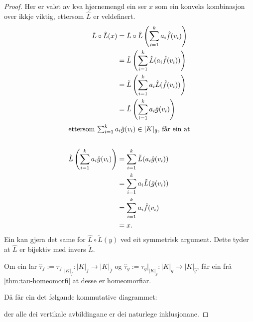 \documentclass[a4paper, 12pt, norsk]{article}
\theoremstyle{plain}
\theoremstyle{definition}
\newcommand{\Rb}{\mathbb{R}}
\newcommand{\gr}[1]{ \lvert #1 \rvert } %
\begin{document}
\begin{proof}
	Her er valet av kva hjørnemengd ein ser \( x \) som ein konveks kombinasjon over ikkje viktig, ettersom $\hat{L}$ er veldefinert.
	\begin{align*}
		\tilde{L}\circ \hat{L}(x) &= \tilde{L}\circ \hat{L}\left(\sum_{i=1}^ka_i\hat{f}(v_i)\right) \\
		&= \tilde{L}\left(\sum_{i=1}^k\hat{L}(a_i\hat{f}(v_i))\right) \\
		&= \tilde{L}\left(\sum_{i=1}^ka_i\hat{L}(\hat{f}(v_i))\right) \\
		&= \tilde{L}\left(\sum_{i=1}^ka_i\hat{g}(v_i)\right) \\
		\intertext{ettersom $\sum_{i=1}^ka_i\hat{g}(v_i)\in\gr{K}_{\hat{g}}$, får ein at} \\
		\tilde{L}\left(\sum_{i=1}^ka_i\hat{g}(v_i)\right) &= \sum_{i=1}^k\tilde{L}(a_i\hat{g}(v_i)) \\
		&= \sum_{i=1}^ka_i\tilde{L}(\hat{g}(v_i)) \\
		&= \sum_{i=1}^ka_i\hat{f}(v_i) \\
		&= x.
	\end{align*}
	Ein kan gjera det same for $\hat{L}\circ\tilde{L}(y)$ ved eit symmetrisk argument. Dette tyder at $\hat{L}$ er bijektiv med invers $\tilde{L}$.
	
	Om ein lar $\hat{\tau}_f:=\tau_f|_{\gr{K}_f} : \gr{K}_f \to \gr{K}_{\hat{f}}$ og $\hat{\tau}_g:=\tau_g|_{\gr{K}_g} : \gr{K}_g \to \gr{K}_{\hat{g}}$, får ein frå \autoref{thm:tau-homeomorfi} at desse er homeomorfiar.
	
	Då får ein det følgande kommutative diagrammet:
	\begin{center} %
	\end{center}
	der alle dei vertikale avbildingane er dei naturlege inklusjonane.


\end{proof}
\end{document}

